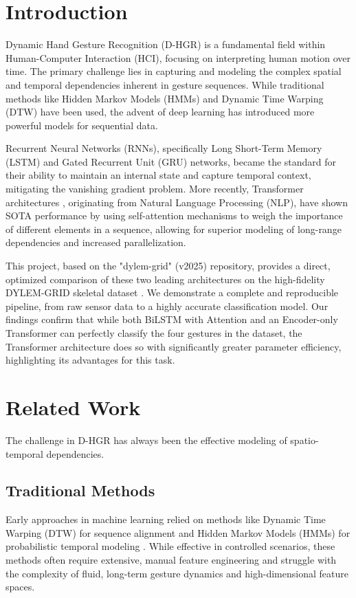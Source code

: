 \documentclass[]{IEEEphot}
\begin{document}

\section{Introduction}
Dynamic Hand Gesture Recognition (D-HGR) is a fundamental field within Human-Computer Interaction (HCI), focusing on interpreting human motion over time. The primary challenge lies in capturing and modeling the complex spatial and temporal dependencies inherent in gesture sequences. While traditional methods like Hidden Markov Models (HMMs) \cite{rabiner1989} and Dynamic Time Warping (DTW) have been used, the advent of deep learning has introduced more powerful models for sequential data.

Recurrent Neural Networks (RNNs), specifically Long Short-Term Memory (LSTM) \cite{hochreiter1997} and Gated Recurrent Unit (GRU) \cite{cho2014} networks, became the standard for their ability to maintain an internal state and capture temporal context, mitigating the vanishing gradient problem. More recently, Transformer architectures \cite{vaswani2017}, originating from Natural Language Processing (NLP), have shown SOTA performance by using self-attention mechanisms to weigh the importance of different elements in a sequence, allowing for superior modeling of long-range dependencies and increased parallelization.

This project, based on the "dylem-grid" (v2025) repository, provides a direct, optimized comparison of these two leading architectures on the high-fidelity DYLEM-GRID skeletal dataset \cite{dylem2024}. We demonstrate a complete and reproducible pipeline, from raw sensor data to a highly accurate classification model. Our findings confirm that while both BiLSTM with Attention and an Encoder-only Transformer can perfectly classify the four gestures in the dataset, the Transformer architecture does so with significantly greater parameter efficiency, highlighting its advantages for this task.

\section{Related Work}
The challenge in D-HGR has always been the effective modeling of spatio-temporal dependencies. 
\subsection{Traditional Methods}
Early approaches in machine learning relied on methods like Dynamic Time Warping (DTW) for sequence alignment and Hidden Markov Models (HMMs) for probabilistic temporal modeling \cite{rabiner1989}. While effective in controlled scenarios, these methods often require extensive, manual feature engineering and struggle with the complexity of fluid, long-term gesture dynamics and high-dimensional feature spaces.
\end{document}
